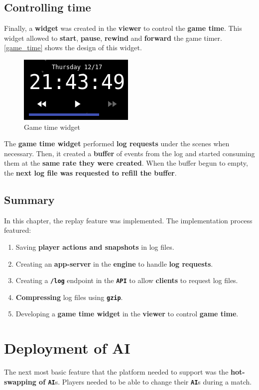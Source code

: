 \documentclass[a4paper,11pt,titlepage,abstract,numbers=noenddot,automark,mnsy,intlimits,rgb,dvipsnames]{report}
\begin{document}
\section{Controlling time}
Finally, a \textbf{widget} was created in the \textbf{viewer} to control the \textbf{game time}. This widget allowed to \textbf{start}, \textbf{pause},
\textbf{rewind} and \textbf{forward} the game timer. \autoref{game_time} shows the design of this widget.
\begin{figure}[H]
\begin{center}
\includegraphics{images/game_time.png}
\end{center}
\caption{Game time widget}
\label{game_time}
\end{figure}
The \textbf{game time widget} performed \textbf{log requests} under the scenes when necessary. Then, it created a \textbf{buffer} of events
from the log and started consuming them at the \textbf{same rate they were created}. When the buffer begun to empty, the \textbf{next log file
was requested to refill the buffer}.
\section{Summary}
In this chapter, the replay feature was implemented. The implementation process featured:
\begin{enumerate}
\item
Saving \textbf{player actions and snapshots} in log files.
\item
Creating an \textbf{app-server} in the \textbf{engine} to handle \textbf{log requests}.
\item
Creating a \textbf{\texttt{/log}} endpoint in the \textbf{\texttt{API}} to allow \textbf{clients} to request log files.
\item
\textbf{Compressing} log files using \textbf{\texttt{gzip}}.
\item
Developing a \textbf{game time widget} in the \textbf{viewer} to control \textbf{game time}.
\end{enumerate}
\chapter{Deployment of AI}
The next most basic feature that the platform needed to support was the \textbf{hot-swapping of \texttt{AI}}s. Players needed to be
able to change their \textbf{\texttt{AI}}s during a match.
\end{document}
